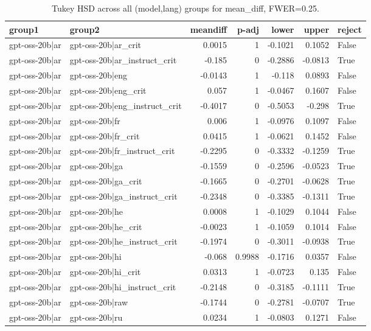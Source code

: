 \begin{table}
\caption{Tukey HSD across all (model,lang) groups for mean_diff, FWER=0.25.}
\label{tab:tukey_all_models_all_langs_mean_diff}
\begin{tabular}{l l r r r r l}
\toprule
group1 & group2 & meandiff & p-adj & lower & upper & reject \\
\midrule
gpt-oss-20b|ar & gpt-oss-20b|ar_crit & 0.0015 & 1 & -0.1021 & 0.1052 & False \\
gpt-oss-20b|ar & gpt-oss-20b|ar_instruct_crit & -0.185 & 0 & -0.2886 & -0.0813 & True \\
gpt-oss-20b|ar & gpt-oss-20b|eng & -0.0143 & 1 & -0.118 & 0.0893 & False \\
gpt-oss-20b|ar & gpt-oss-20b|eng_crit & 0.057 & 1 & -0.0467 & 0.1607 & False \\
gpt-oss-20b|ar & gpt-oss-20b|eng_instruct_crit & -0.4017 & 0 & -0.5053 & -0.298 & True \\
gpt-oss-20b|ar & gpt-oss-20b|fr & 0.006 & 1 & -0.0976 & 0.1097 & False \\
gpt-oss-20b|ar & gpt-oss-20b|fr_crit & 0.0415 & 1 & -0.0621 & 0.1452 & False \\
gpt-oss-20b|ar & gpt-oss-20b|fr_instruct_crit & -0.2295 & 0 & -0.3332 & -0.1259 & True \\
gpt-oss-20b|ar & gpt-oss-20b|ga & -0.1559 & 0 & -0.2596 & -0.0523 & True \\
gpt-oss-20b|ar & gpt-oss-20b|ga_crit & -0.1665 & 0 & -0.2701 & -0.0628 & True \\
gpt-oss-20b|ar & gpt-oss-20b|ga_instruct_crit & -0.2348 & 0 & -0.3385 & -0.1311 & True \\
gpt-oss-20b|ar & gpt-oss-20b|he & 0.0008 & 1 & -0.1029 & 0.1044 & False \\
gpt-oss-20b|ar & gpt-oss-20b|he_crit & -0.0023 & 1 & -0.1059 & 0.1014 & False \\
gpt-oss-20b|ar & gpt-oss-20b|he_instruct_crit & -0.1974 & 0 & -0.3011 & -0.0938 & True \\
gpt-oss-20b|ar & gpt-oss-20b|hi & -0.068 & 0.9988 & -0.1716 & 0.0357 & False \\
gpt-oss-20b|ar & gpt-oss-20b|hi_crit & 0.0313 & 1 & -0.0723 & 0.135 & False \\
gpt-oss-20b|ar & gpt-oss-20b|hi_instruct_crit & -0.2148 & 0 & -0.3185 & -0.1111 & True \\
gpt-oss-20b|ar & gpt-oss-20b|raw & -0.1744 & 0 & -0.2781 & -0.0707 & True \\
gpt-oss-20b|ar & gpt-oss-20b|ru & 0.0234 & 1 & -0.0803 & 0.1271 & False \\

\end{tabular}
\end{table}
